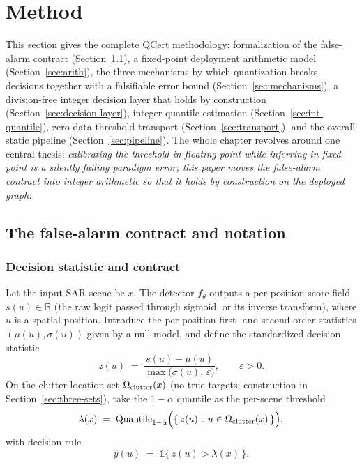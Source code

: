 \section{Method}
\label{sec:method}

This section gives the complete QCert methodology: formalization of the false-alarm contract (Section~\ref{sec:contract}), a fixed-point deployment arithmetic model (Section~\ref{sec:arith}), the three mechanisms by which quantization breaks decisions together with a falsifiable error bound (Section~\ref{sec:mechanisms}), a division-free integer decision layer that holds by construction (Section~\ref{sec:decision-layer}), integer quantile estimation (Section~\ref{sec:int-quantile}), zero-data threshold transport (Section~\ref{sec:transport}), and the overall static pipeline (Section~\ref{sec:pipeline}).
The whole chapter revolves around one central thesis: \emph{calibrating the threshold in floating point while inferring in fixed point is a silently failing paradigm error; this paper moves the false-alarm contract into integer arithmetic so that it holds by construction on the deployed graph.}

\subsection{The false-alarm contract and notation}
\label{sec:contract}

\subsubsection{Decision statistic and contract}
\label{sec:contract-def}

Let the input SAR scene be $x$. The detector $f_\theta$ outputs a per-position score field $s(u)\in\mathbb{R}$ (the raw logit passed through sigmoid, or its inverse transform), where $u$ is a spatial position.
Introduce the per-position first- and second-order statistics $(\mu(u),\sigma(u))$ given by a null model, and define the standardized decision statistic
\begin{equation}
z(u) \;=\; \frac{s(u)-\mu(u)}{\max\!\big(\sigma(u),\,\varepsilon\big)},\qquad \varepsilon>0 .
\label{eq:z}
\end{equation}
On the clutter-location set $\Omega_{\mathrm{clutter}}(x)$ (no true targets; construction in Section~\ref{sec:three-sets}), take the $1-\alpha$ quantile as the per-scene threshold
\begin{equation}
\lambda(x) \;=\; \mathrm{Quantile}_{1-\alpha}\Big(\{\,z(u):\,u\in\Omega_{\mathrm{clutter}}(x)\,\}\Big),
\label{eq:lambda-scene}
\end{equation}
with decision rule
\begin{equation}
\hat{y}(u) \;=\; \mathbb{1}\{\,z(u)>\lambda(x)\,\}.
\label{eq:decision}
\end{equation}

